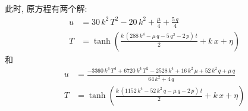 \begin{frame}
此时, 原方程有两个解:
\[
\begin{aligned}
u&=30\,{k}^{2}\,{T}^{2}-20\,{k}^{2}+\frac{\mu}{4}+\frac{5\,q}{4} \\
T&=\tanh\left( \frac{k\,\left( 288\,{k}^{4}-\mu\,q-5\,{q}^{2}-2\,p\right) \,t}{2}+k\,x+\eta\right)
\end{aligned}
\]
和
\[
\begin{aligned}
u&=\frac{{-3360\,{k}^{4}\,{T}^{4}+6720\,{k}^{4}\,{T}^{2}-2528\,{k}^{4}+16\,{k}^{2}\,\mu+52\,{k}^{2}\,q+\mu\,q}}{64\,{k}^{2}+4\,q}\\ 
T&=\tanh\left( \frac{k\,\left( 1152\,{k}^{4}-52\,{k}^{2}\,q-\mu\,q-2\,p\right) \,t}{2}+k\,x+\eta\right) 
\end{aligned}
\]
\end{frame}
